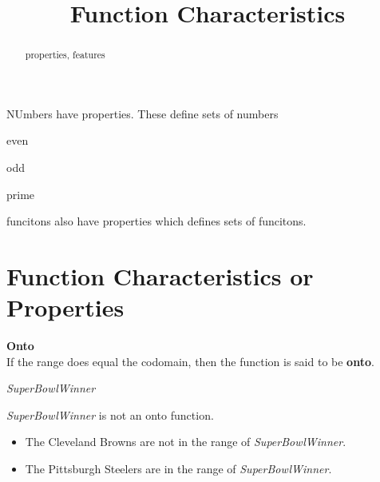 \documentclass{ximera}
\title{Function Characteristics}
\begin{document}
\begin{abstract}
properties, features
\end{abstract}
\maketitle





NUmbers have properties.  These define sets of numbers

even

odd

prime

funcitons also have properties which defines sets of funcitons.







\section{Function Characteristics or Properties}










\begin{definition} \textbf{\textcolor{green!50!black}{Onto}} \\

If the range does equal the codomain, then the function is said to be \textbf{onto}.

\end{definition}









\begin{example} \textit{SuperBowlWinner}


\textit{SuperBowlWinner} is not an onto function.


\begin{itemize}
\item The Cleveland Browns are not in the range of \textit{SuperBowlWinner}.  
\item The Pittsburgh Steelers are in the range of \textit{SuperBowlWinner}.
\end{itemize}

\end{example}
\end{document}
